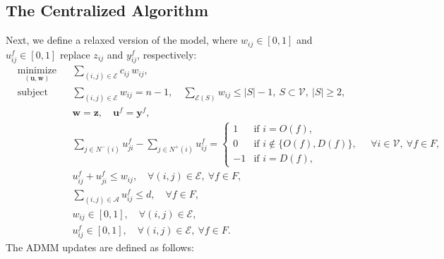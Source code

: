 \documentclass[11pt,a4paper]{article}
\theoremstyle{plain}
\theoremstyle{definition}
\theoremstyle{remark}
\begin{document}
	\subsection{The Centralized Algorithm}
	Next, we define a relaxed version of the model, where \( w_{ij} \in [0,1] \) and \( u_{ij}^f \in [0,1] \) replace \( z_{ij} \) and \( y_{ij}^f \), respectively:
	\begin{subequations}
		\begin{align}
			& \underset{(\boldsymbol{u}, \boldsymbol{w})}{\text{minimize}}
			&& \sum_{(i,j) \in \mathcal{E}} c_{ij} \, w_{ij},
			\label{eq:objective2} \\[0.3em]
			& \text{subject to}
			&& \sum_{(i,j) \in \mathcal{E}} w_{ij} = n - 1,\quad \sum_{\mathcal{E}(S)}w_{ij}\leq|S|-1,\ S\subset\mathcal{V}, \ |S|\geq2,
			\label{eq:constraint1} \\[0.3em]
			&&& \boldsymbol{w} = \boldsymbol{z}, \quad \boldsymbol{u}^f = \boldsymbol{y}^f,
			\label{eq:constraint2} \\[0.3em]
			&&& \sum_{j \in N^{-}(i)} u_{ji}^{f} - \sum_{j \in N^{+}(i)} u_{ij}^{f} =
			\begin{cases}
				1 & \text{if } i = O(f), \\[0.2em]
				0 & \text{if } i \notin \{O(f), D(f)\}, \\[0.2em]
				-1 & \text{if } i = D(f),
			\end{cases}
			\quad \forall i \in \mathcal{V},\ \forall f \in F,
			\label{eq:constraint3} \\[0.5em]
			&&& u_{ij}^f + u_{ji}^f \leq w_{ij},
			\quad \forall (i,j) \in \mathcal{E},\ \forall f \in F,
			\label{eq:constraint4} \\[0.3em]
			&&& \sum_{(i,j) \in \mathcal{A}} u_{ij}^f \leq d,
			\quad \forall f \in F,
			\label{eq:constraint5} \\[0.3em]
			&&& w_{ij} \in [0,1],\quad \forall (i,j) \in \mathcal{E}, \nonumber\\
			&&& u_{ij}^f \in [0,1],\quad \forall (i,j) \in \mathcal{E},\ \forall f \in F.
			\label{eq:constraint6}
		\end{align}
	\end{subequations}
	The ADMM updates are defined as follows:
\end{document}
